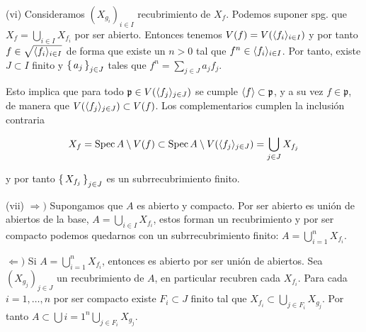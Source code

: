 \documentclass[../main.tex]{subfiles}
\begin{document}
(vi) Consideramos $(X_{g_i})_{i\in I}$ recubrimiento de $X_f$. Podemos suponer spg. que $X_f = \bigcup_{i\in I} X_{f_i}$ por ser abierto. Entonces tenemos $V(f) = V(\langle f_i \rangle_{i\in I})$ y por tanto $f\in \sqrt{\langle f_i \rangle_{i\in I}}$ de forma que existe un $n>0$ tal que $f^n \in \langle f_i \rangle_{i\in I}$.
Por tanto, existe $J\subset I$ finito y $\set{a_j}_{j\in J}$ tales que $f^n = \sum_{j\in J}a_j f_j$.

Esto implica que para todo $\mathfrak p \in  V(\langle f_j \rangle_{j\in J})$ se cumple $\langle f \rangle \subset \mathfrak p$, y a su vez $f \in \mathfrak p$, de manera que $ V(\langle f_j \rangle_{j\in J}) \subset V(f)$. Los complementarios cumplen la inclusión contraria

\[ X_f = \operatorname{Spec} A \setminus V(f) \subset \operatorname{Spec} A \setminus V(\langle f_j \rangle_{j\in J}) = \bigcup_{j\in J} X_{f_j} \]

y por tanto $\set{X_{f_j}}_{j\in J}$ es un subrrecubrimiento finito.

(vii) $\Rightarrow)$ Supongamos que $A$ es abierto y compacto. Por ser abierto es unión de abiertos de la base, $A=\bigcup_{i\in I}X_{f_i}$, estos forman un recubrimiento y por ser compacto podemos quedarnos con un subrrecubrimiento finito: $A=\bigcup_{i=1}^n X_{f_i}$.

$\Leftarrow)$ Si $A=\bigcup_{i=1}^n X_{f_i}$, entonces es abierto por ser unión de abiertos. Sea $(X_{g_j})_{j\in J}$ un recubrimiento de $A$, en particular recubren cada $X_{f_i}$. Para cada $i=1,\dots, n$ por ser compacto existe $F_i \subset J$ finito tal que $X_{f_i}\subset \bigcup_{j \in F_i} X_{g_j}$. Por tanto $A \subset \bigcup{i=1}^n \bigcup_{j \in F_i} X_{g_j}$.
\end{document}
